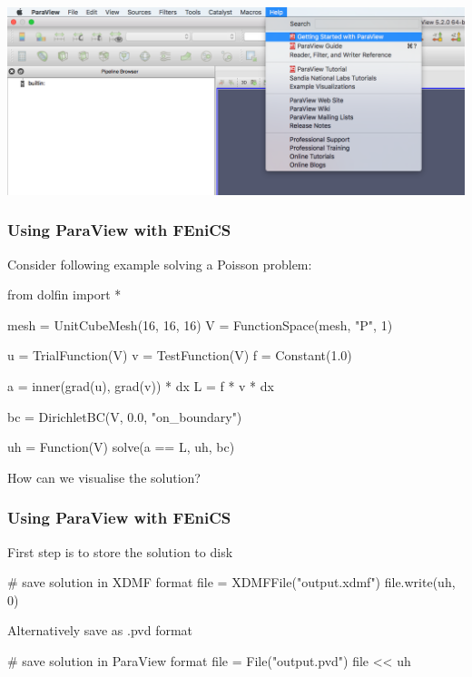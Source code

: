 \begin{frame}[fragile]
  \begin{minipage}{0.89\textwidth}
    \begin{center}
      \includegraphics[width=\textwidth]{png/paraview_help_menu.png}
    \end{center}
  \end{minipage}
\end{frame}


\begin{frame}[fragile]
\frametitle{Using ParaView with FEniCS}
  Consider following example solving a Poisson problem:
  \begin{python}
from dolfin import *

mesh = UnitCubeMesh(16, 16, 16)
V = FunctionSpace(mesh, "P", 1)

u = TrialFunction(V)
v = TestFunction(V)
f = Constant(1.0)

a = inner(grad(u), grad(v)) * dx
L = f * v * dx

bc = DirichletBC(V, 0.0, "on_boundary")

uh = Function(V)
solve(a == L, uh, bc)
\end{python}

How can we visualise the solution?

\end{frame}

\begin{frame}[fragile]
\frametitle{Using ParaView with FEniCS}
First step is to store the solution to disk
  \begin{python}
# save solution in XDMF format
file = XDMFFile("output.xdmf")
file.write(uh, 0)
  \end{python}
\bigskip
  Alternatively save as .pvd format
  \begin{python}
# save solution in ParaView format
file = File("output.pvd")
file << uh
  \end{python}
\end{frame}

